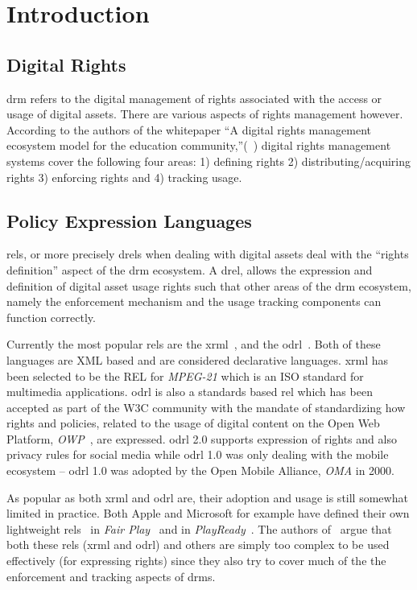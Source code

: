 \chapter{Introduction}

\section{Digital Rights} 

\ac{drm} refers to the digital management of rights associated with the access or usage of digital assets. There are various aspects of rights management however. According to the authors of the whitepaper ``A digital rights management ecosystem model for the education community,''(~\cite{collier})
 digital rights management systems cover the following four areas: 1) defining rights 2) distributing/acquiring rights 3) enforcing rights and 4) tracking usage.

\section{Policy Expression Languages}

\ac{rel}s, or more precisely \ac{drel}s when dealing with digital assets deal with the ``rights definition'' aspect of the \ac{drm} ecosystem. A \ac{drel}, allows the expression and definition of digital asset usage rights such that other areas of the \ac{drm} ecosystem, namely the enforcement mechanism and the usage tracking components can function correctly.

Currently the most popular \ac{rel}s are the \ac{xrml}~\cite{Wang}, and the \ac{odrl}~\cite{odrloneone}. Both of these languages are XML based and are considered declarative languages. \ac{xrml} has been selected to be the REL for \emph{MPEG-21} which is an ISO standard for multimedia applications. \ac{odrl} is also a standards based \ac{rel} which has been accepted as part of the W3C community with the mandate of standardizing how rights and policies, related to the usage of digital content on the Open Web Platform, \emph{OWP}~\cite{openwebplatform}, are expressed. \ac{odrl} 2.0 supports expression of rights and also privacy rules for social media while \ac{odrl} 1.0 was only dealing with the mobile ecosystem -- \ac{odrl} 1.0 was adopted by the Open Mobile Alliance, \emph{OMA} in 2000.

As popular as both \ac{xrml} and \ac{odrl} are, their adoption and usage is still somewhat limited in practice. Both Apple and Microsoft for example have defined their own lightweight \ac{rel}s~\cite{problemwithrels} in \emph{Fair Play}~\cite{fairplay} and in \emph{PlayReady}~\cite{playready}. The authors of~\cite{problemwithrels} argue that both these \ac{rel}s (\ac{xrml} and \ac{odrl}) and others are simply too complex to be used effectively (for expressing rights) since they also try to cover much of the the enforcement and tracking aspects of \ac{drm}s.

